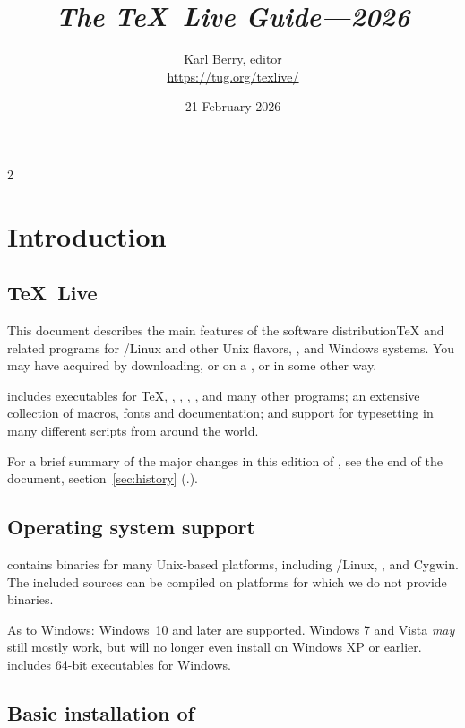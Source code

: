 \documentclass[12pt]{article}
\title{%
  {\huge \textit{The \TeX\ Live Guide---2026}}
}
\author{Karl Berry, editor \\[3mm]
        \url{https://tug.org/texlive/}
       }
\date{21 February 2026}
\begin{document}
\maketitle

\begin{multicols}{2}
\tableofcontents
\end{multicols}

\section{Introduction}
\label{sec:intro}

\subsection{\protect\TeX\protect\ Live}

This document describes the main features of the \TL{} software
distribution\Dash \TeX{} and related programs for \GNU/Linux and other
Unix flavors, \macOS, and Windows systems. You may have acquired \TL{}
by downloading, or on a \DVD, or in some other way.

\TL{} includes executables for \TeX{}, \LaTeXe{}, \ConTeXt,
\MF, \MP, \BibTeX{} and many other programs; an extensive collection
of macros, fonts and documentation; and support for typesetting in
many different scripts from around the world.

For a brief summary of the major changes in this edition of \TL{},
see the end of the document, section~\ref{sec:history}
(\p.\pageref{sec:history}).


\subsection{Operating system support}
\label{sec:os-support}

\TL{} contains binaries for many Unix-based platforms, including
\GNU/Linux, \macOS, and Cygwin.  The included sources can be compiled
on platforms for which we do not provide binaries.

As to Windows: Windows~10 and later are supported. Windows 7 and Vista
\emph{may} still mostly work, but \TL{} will no longer even install
on Windows XP or earlier.  \TL{} includes 64-bit executables for
Windows.


\subsection{Basic installation of \protect\TL{}}
\label{sec:basic}
\end{document}
